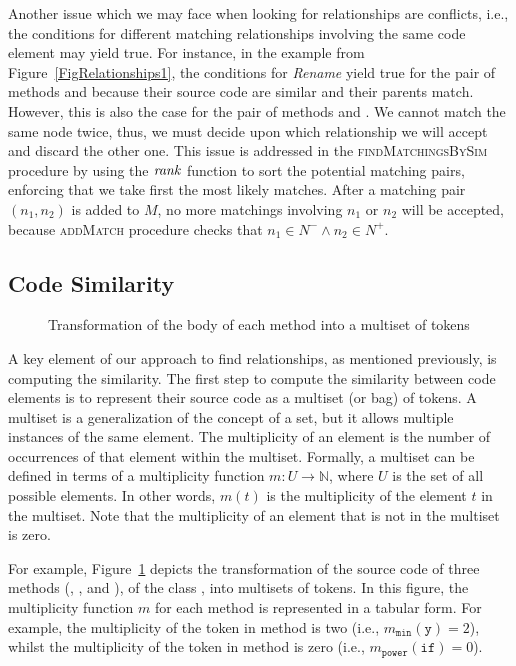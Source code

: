 Another issue which we may face when looking for relationships are conflicts, i.e., the conditions for different matching relationships involving the same code element may yield true.
For instance, in the example from Figure~\ref{FigRelationships1}, the conditions for \textit{Rename} yield true for the pair of methods  and  because their source code are similar and their parents match.
However, this is also the case for the pair of methods  and .
We cannot match the same node twice, thus, we must decide upon which relationship we will accept and discard the other one.
This issue is addressed in the \textsc{findMatchingsBySim} procedure by using the $\operatorname{\mathit{rank}}$ function to sort the potential matching pairs, enforcing that we take first the most likely matches.
After a matching pair $(n_1, n_2)$ is added to $M$, no more matchings involving $n_1$ or $n_2$ will be accepted, because \textsc{addMatch} procedure checks that $n_1 \in N^- \land n_2 \in N^+$.

\subsection{Code Similarity}
\label{SecCodeSim}

\begin{figure}[htb]
\renewcommand{\arraystretch}{1.3}
\centering
\footnotesize

\caption{Transformation of the body of each method into a multiset of tokens}
\label{FigSourceCodeTransformation}
\end{figure}

A key element of our approach to find relationships, as mentioned previously, is computing the similarity.
The first step to compute the similarity between code elements is to represent their source code as a multiset (or bag) of tokens.
A multiset is a generalization of the concept of a set, but it allows multiple instances of the same element.
The multiplicity of an element is the number of occurrences of that element within the multiset. Formally, a multiset can be defined in terms of a multiplicity function $m: U \to \mathbb{N}$, where $U$ is the set of all possible elements. In other words, $m(t)$ is the multiplicity of the element $t$ in the multiset. Note that the multiplicity of an element that is not in the multiset is zero.

For example, Figure~\ref{FigSourceCodeTransformation} depicts the transformation of the source code of three methods (, , and ), of the class , into multisets of tokens. In this figure, the multiplicity function $m$ for each method is represented in a tabular form. For example, the multiplicity of the token  in method  is two (i.e., $m_{\mathtt{min}}(\mathtt{y}) = 2$), whilst the multiplicity of the token  in method  is zero (i.e., $m_{\mathtt{power}}(\mathtt{if}) = 0$).

